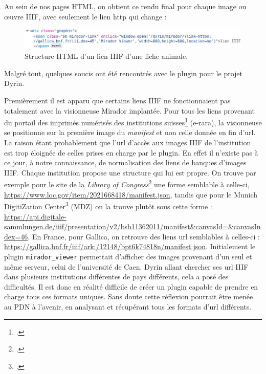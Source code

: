 \documentclass[a4paper,12pt,twoside]{book}
\begin{document}
Au sein de nos pages \acrshort{HTML}, on obtient ce rendu final pour chaque image ou \oe{}uvre \acrshort{IIIF}, avec seulement le lien http qui change :

\begin{figure}[H]
    \centering
    \includegraphics[width=15cm]{img/partie_3/html_mirador.JPG}
    \caption{Structure \acrshort{HTML} d'un lien \acrshort{IIIF} d'une fiche animale.}
\end{figure}

Malgré tout, quelques soucis ont été rencontrés avec le plugin pour le projet Dyrin. 

Premièrement il est apparu que certains liens \acrshort{IIIF} ne fonctionnaient pas totalement avec la visionneuse Mirador implantée. Pour tous les liens provenant du portail des imprimés numérisés des institutions suisses\footcite{e-rara} (e-rara), la visionneuse se positionne sur la première image du \textit{manifest} et non celle donnée en fin d'url. La raison étant probablement que l'url d'accès aux images \acrshort{IIIF} de l'institution est trop éloignée de celles prises en charge par le plugin. En effet il n'existe pas à ce jour, à notre connaissance, de normalisation des liens de banques d'images \acrshort{IIIF}. Chaque institution propose une structure qui lui est propre. On trouve par exemple pour le site de la \textit{Library of Congress}\footcite{congress} une forme semblable à celle-ci, \url{https://www.loc.gov/item/2021668418/manifest.json}, tandis que pour le Munich DigitiZation Center\footcite{munich} (MDZ) on la trouve plutôt sous cette forme : \url{https://api.digitale-sammlungen.de/iiif/presentation/v2/bsb11362011/manifest&canvasId=&canvasIndex=46}. En France, pour Gallica, on retrouve des liens url semblables à celles-ci : \url{https://gallica.bnf.fr/iiif/ark:/12148/bpt6k74818n/manifest.json}. Initialement le plugin \texttt{mirador\_viewer} permettait d'afficher des images provenant d'un seul et même serveur, celui de l'université de Caen. Dyrin allant chercher ses url \acrshort{IIIF} dans plusieurs institutions différentes de pays différents, cela a posé des difficultés. Il est donc en réalité difficile de créer un plugin capable de prendre en charge tous ces formats uniques. Sans doute cette réflexion pourrait être menée au \acrshort{PDN} à l'avenir, en analysant et récupérant tous les formats d'url différents.
\end{document}
